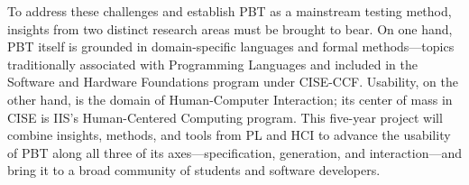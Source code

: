 


To address these challenges and establish PBT as a mainstream
testing method, insights from two distinct research areas must be
brought to bear.
On one hand, PBT itself is grounded in domain-specific languages and
formal methods---topics traditionally associated with Programming
Languages and included in the Software and Hardware Foundations
program under CISE-CCF.  Usability, on the other hand, is the domain
of Human-Computer Interaction; its center of mass in CISE is IIS's
Human-Centered Computing program.
%
This five-year project will combine insights, methods, and tools from
PL and HCI to advance the usability of PBT along all three of its
axes---specification, generation, and interaction\iflater{}\fi---and bring it to a
broad community of students and software developers.

